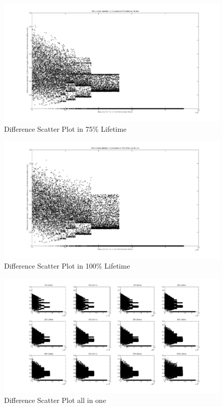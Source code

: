 \documentclass[12pt,a4paper]{report}
\begin{document}
	\vspace{-5cm}
	\begin{figure}
	\hspace{-3.7cm}\includegraphics[width=200mm]{seventyfive.jpg}
	\caption{Difference Scatter Plot in 75\% Lifetime}
	\end{figure}
	
	\vspace{-5cm}
	\begin{figure}
	\hspace{-3.7cm}\includegraphics[width=200mm]{hundred.jpg}
	\caption{Difference Scatter Plot in 100\% Lifetime}
	\end{figure}

	\vspace{-5cm}
	\begin{figure}
	\hspace{-3.7cm}\includegraphics[width=200mm]{total.jpg}
	\caption{Difference Scatter Plot all in one}
	\end{figure}
\end{document}
